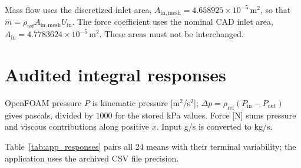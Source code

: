 Mass flow uses the discretized inlet area,
$A_{\mathrm{in,mesh}}=4.658925\times10^{-5}\,\mathrm{m^2}$, so that
$\dot m=\rho_{\mathrm{ref}}A_{\mathrm{in,mesh}}U_{\mathrm{in}}$.
The force coefficient uses the nominal CAD inlet area,
$A_{\mathrm{in}}=4.7783624\times10^{-5}\,\mathrm{m^2}$. These areas must not be interchanged.



\clearpage
\section{Audited integral responses}
\label{sec:app_response_data}

OpenFOAM pressure $P$ is kinematic pressure [m$^2$/s$^2$]; $\Delta p=\rho_{\mathrm{ref}}(P_{\mathrm{in}}-P_{\mathrm{out}})$ gives pascals, divided by $1000$ for the stored kPa values. Force [N] sums pressure and viscous contributions along positive $x$. Input g/s is converted to kg/s. 

Table~\ref{tab:app_responses} pairs all 24 means with their terminal variability; the application uses the archived CSV file precision.

